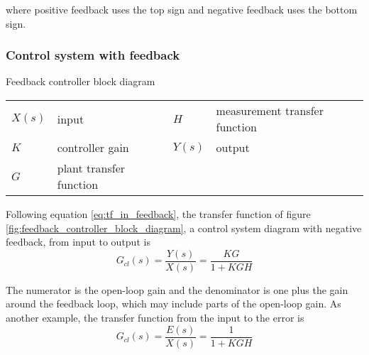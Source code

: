 where positive feedback uses the top sign and negative feedback uses the bottom
sign.

\subsubsection{Control system with feedback}
\begin{bookfigure}

  \caption{Feedback controller block diagram}
  \label{fig:feedback_controller_block_diagram}
  \begin{figurekey}
    \begin{tabular}{llll}
      $X(s)$ & input & $H$ & measurement transfer function \\
      $K$ & controller gain & $Y(s)$ & output \\
      $G$ & plant transfer function & & \\
    \end{tabular}
  \end{figurekey}
\end{bookfigure}

Following equation \eqref{eq:tf_in_feedback}, the transfer function of figure
\ref{fig:feedback_controller_block_diagram}, a \gls{control system} diagram with
negative feedback, from input to output is
\begin{equation}
  G_{cl}(s) = \frac{Y(s)}{X(s)} = \frac{KG}{1 + KGH}
\end{equation}

The numerator is the \gls{open-loop gain} and the denominator is one plus the
gain around the feedback loop, which may include parts of the
\gls{open-loop gain}. As another example, the transfer function from the input
to the \gls{error} is
\begin{equation}
  G_{cl}(s) = \frac{E(s)}{X(s)} = \frac{1}{1 + KGH}
\end{equation}

